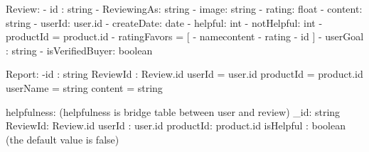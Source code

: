 Review:
    - id : string
    - ReviewingAs: string
    - image: string
    - rating: float
    - content: string
    - userId: user.id
    - createDate: date
    - helpful: int
    - notHelpful: int
    - productId = product.id 
    - ratingFavors = [{
        - namecontent
        - rating
        - id
    }]
    - userGoal : string
    - isVerifiedBuyer: boolean

Report:
    -id : string
    ReviewId : Review.id
    userId = user.id
    productId = product.id
    userName = string
    content = string

helpfulness: (helpfulness is bridge table between user and review)
    _id: string
    ReviewId: Review.id
    userId : user.id
    productId: product.id
    isHelpful : boolean (the default value is false)